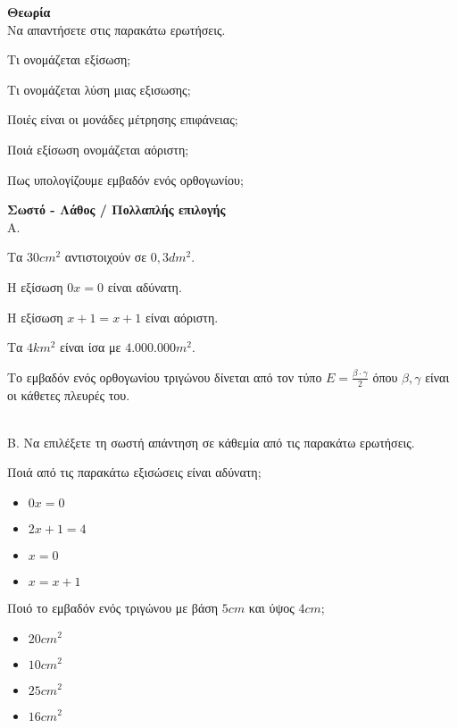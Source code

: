 \documentclass[ektypwsh]{diag-xelatex}
\begin{document}
\thewria
\begin{thema}
\item \textbf{Θεωρία}\\
Να απαντήσετε στις παρακάτω ερωτήσεις.
\begin{rlist}
\item Τι ονομάζεται εξίσωση;
\item Τι ονομάζεται λύση μιας εξισωσης;
\item Ποιές είναι οι μονάδες μέτρησης επιφάνειας;
\item Ποιά εξίσωση ονομάζεται αόριστη;
\item Πως υπολογίζουμε εμβαδόν ενός ορθογωνίου;
\end{rlist}
\item \textbf{Σωστό - Λάθος / Πολλαπλής επιλογής}\\
Α. \swstolathosd
\begin{rlist}
\item Τα $ 30cm^2 $ αντιστοιχούν σε $ 0{,}3dm^2 $.
\item Η εξίσωση $ 0x=0 $ είναι αδύνατη.
\item Η εξίσωση $ x+1=x+1 $ είναι αόριστη.
\item Τα $ 4km^2 $ είναι ίσα με $ 4.000.000m^2 $.
\item Το εμβαδόν ενός ορθογωνίου τριγώνου δίνεται από τον τύπο $ E=\frac{\beta\cdot\gamma}{2} $ όπου $ \beta,\gamma $ είναι οι κάθετες πλευρές του.
\end{rlist}\\
Β. Να επιλέξετε τη σωστή απάντηση σε κάθεμία από τις παρακάτω ερωτήσεις.
\begin{rlist}
\item Ποιά από τις παρακάτω εξισώσεις είναι αδύνατη;
\begin{multicols}{4}
\begin{itemize}
\item $ 0x=0 $
\item $ 2x+1=4 $
\item $ x=0 $
\item $ x=x+1 $
\end{itemize}
\end{multicols}
\item Ποιό το εμβαδόν ενός τριγώνου με βάση $ 5cm $ και ύψος $ 4cm $;
\begin{multicols}{4}
\begin{itemize}
\item $ 20cm^2 $
\item $ 10cm^2 $
\item $ 25cm^2 $
\item $ 16cm^2 $
\end{itemize}
\end{multicols}
\end{rlist}
\end{thema}
\end{document}
